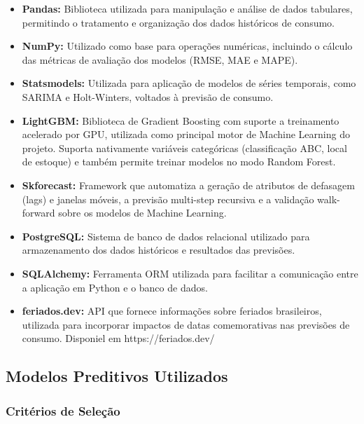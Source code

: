 \documentclass[12pt,a4paper]{article}
\begin{document}
\begin{itemize}
    \item \textbf{Pandas:} Biblioteca utilizada para manipulação e análise de dados tabulares, permitindo o tratamento e organização dos dados históricos de consumo.
    \item \textbf{NumPy:} Utilizado como base para operações numéricas, incluindo o cálculo das métricas de avaliação dos modelos (RMSE, MAE e MAPE).
    \item \textbf{Statsmodels:} Utilizada para aplicação de modelos de séries temporais, como SARIMA e Holt-Winters, voltados à previsão de consumo.
    \item \textbf{LightGBM:} Biblioteca de Gradient Boosting com suporte a treinamento acelerado por GPU, utilizada como principal motor de Machine Learning do projeto. Suporta nativamente variáveis categóricas (classificação ABC, local de estoque) e também permite treinar modelos no modo Random Forest.
    \item \textbf{Skforecast:} Framework que automatiza a geração de atributos de defasagem (lags) e janelas móveis, a previsão multi-step recursiva e a validação walk-forward sobre os modelos de Machine Learning.
\end{itemize}

\begin{itemize}
    \item \textbf{PostgreSQL:} Sistema de banco de dados relacional utilizado para armazenamento dos dados históricos e resultados das previsões.
    \item \textbf{SQLAlchemy:} Ferramenta ORM utilizada para facilitar a comunicação entre a aplicação em Python e o banco de dados.
\end{itemize}

\begin{itemize}
    \item \textbf{feriados.dev:} API que fornece informações sobre feriados brasileiros, utilizada para incorporar impactos de datas comemorativas nas previsões de consumo. Disponiel em https://feriados.dev/
\end{itemize}

\subsection{Modelos Preditivos Utilizados}

\subsubsection{Critérios de Seleção}
\end{document}
